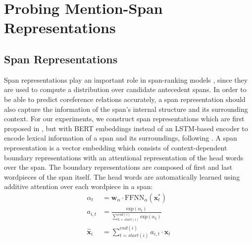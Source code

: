 \documentclass[11pt]{article}
\begin{document}
\section{Probing Mention-Span Representations}


\subsection{Span Representations}
\label{subsection:spanreps}

Span representations play an important role in span-ranking models \parencite{lee2017end,lee2018higher,joshi2019coref}, since they are used to compute a distribution over candidate antecedent spans. In order to be able to predict coreference relations accurately, a span representation should also capture the information of the span's internal structure and its surrounding context. For our experiments, we construct span representations which are first proposed in \textcite{lee2017end}, but with BERT embeddings \parencite{devlin2019bert} instead of an LSTM-based encoder to encode lexical information of a span and its surroundings, following \textcite{joshi2019coref}. A span representation is a vector embedding which consists of context-dependent boundary representations with an attentional representation of the head words over the span. The boundary representations are composed of first and last wordpieces of the span itself. The head words are automatically learned using additive attention \parencite{bahdanau} over each wordpiece in a span: 
\begin{align}
\alpha_{t} &= \pmb{w}_{\alpha} \cdot \text{FFNN}_{\alpha}(\pmb{x}_{t}^{*}) \\ 
a_{i,t} &=  \frac{\text{exp}(\alpha_{t})}{\sum\limits_{k=start(i)}^{end(i)} \text{exp}(\alpha_{k})} \\ 
\hat{\pmb{x}}_{i} &= \sum\limits_{t=start(i)}^{end(i)} a_{i,t} \cdot \pmb{x}_{t}
\end{align}
\end{document}
